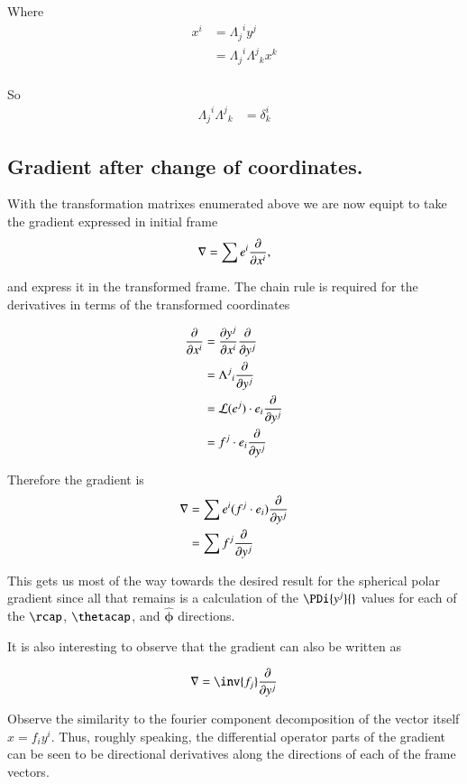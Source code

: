 \documentclass{article}
\newcommand{\phicap}[0]{\hat{\boldsymbol{\phi}}}
\begin{document}
Where
\begin{align*}
x^i &= {\Lambda_j}^i y^j \\
&= {\Lambda_j}^i {\Lambda^j}_k x^k \\
\end{align*}

So
\begin{align*}
{\Lambda_j}^i {\Lambda^j}_k &= \delta^i_k
\end{align*}

\subsection{ Gradient after change of coordinates. }

With the transformation matrixes enumerated above we are now equipt to take the gradient expressed in initial frame
\begin{align*}
\grad = \sum e^i \PD{x^i}{},
\end{align*}

and express it in the transformed frame.  The chain rule is required for the derivatives in terms of the transformed coordinates

\begin{align*}
\PD{x^i}{} 
&= \PD{x^i}{y^j} \PD{y^j}{} \\
&= {\Lambda^j}_i \PD{y^j}{} \\
&= \LL(e^j) \cdot e_i \PD{y^j}{} \\
&= f^j \cdot e_i \PD{y^j}{}
\end{align*}

Therefore the gradient is
\begin{align*}
\grad &= \sum e^i (f^j \cdot e_i) \PD{y^j}{} \\
      &= \sum f^j \PD{y^j}{} \\
\end{align*}

This gets us most of the way towards the desired result for the spherical polar gradient since all that remains is a calculation of the $\PDi{y^j}{}$
values for
each of the $\rcap$, $\thetacap$, and $\phicap$ directions.

It is also interesting to observe that the gradient can also be written as

\begin{align*}
\grad &= \inv{f_j} \PD{y^j}{} \\
\end{align*}

Observe the similarity to the fourier component decomposition of the vector itself $x = f_i y^i$.  Thus, roughly speaking, the differential operator
parts of the gradient can be seen to be directional derivatives 
along the directions of each of the frame vectors.
\end{document}
